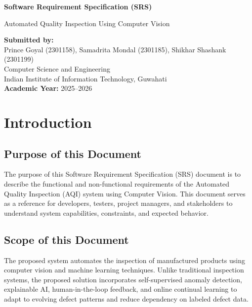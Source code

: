 \documentclass[12pt,a4paper]{article}
\begin{document}
\begin{titlepage}
    \centering
    \vspace*{2cm}
    {\Huge \bfseries Software Requirement Specification (SRS)\par}
    \vspace{1.5cm}
    {\Large Automated Quality Inspection Using Computer Vision\par}
    \vspace{2cm}
    \textbf{Submitted by:}\\
    Prince Goyal (2301158), Samadrita Mondal (2301185), Shikhar Shashank (2301199)
    \\
    Computer Science and Engineering\\
    Indian Institute of Information Technology, Guwahati\\
    \vfill
    \textbf{Academic Year:} 2025--2026
\end{titlepage}

\tableofcontents
\newpage

\section{Introduction}

\subsection{Purpose of this Document}
The purpose of this Software Requirement Specification (SRS) document is to describe the functional and non-functional requirements of the Automated Quality Inspection (AQI) system using Computer Vision. This document serves as a reference for developers, testers, project managers, and stakeholders to understand system capabilities, constraints, and expected behavior.

\subsection{Scope of this Document}
The proposed system automates the inspection of manufactured products using computer vision and machine learning techniques. Unlike traditional inspection systems, the proposed solution incorporates self-supervised anomaly detection, explainable AI, human-in-the-loop feedback, and online continual learning to adapt to evolving defect patterns and reduce dependency on labeled defect data.
\end{document}
